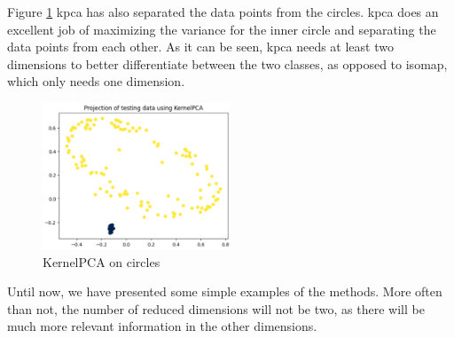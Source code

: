 Figure \ref{fig:circles-kernelpca} \gls{kpca} has also separated the data points from the circles. \gls{kpca} does an excellent job of maximizing the variance for the inner circle and separating the data points from each other. As it can be seen, \gls{kpca} needs at least two dimensions to better differentiate between the two classes, as opposed to \gls{isomap}, which only needs one dimension.
\begin{figure}[htb!]
    \centering
    \includegraphics[width=0.5\textwidth]{figures/theory-example-figures/circles-kernelpca.png}
    \caption{KernelPCA on circles}
    \label{fig:circles-kernelpca}
\end{figure}


Until now, we have presented some simple examples of the methods. More often than not, the number of reduced dimensions will not be two, as there will be much more relevant information in the other dimensions.